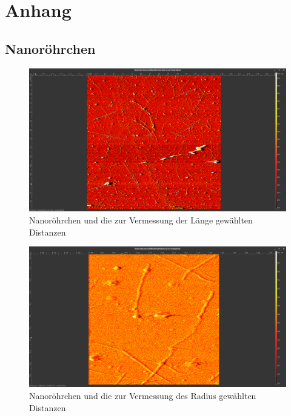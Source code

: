 

\chapter{Anhang}
\label{chap:anhangA}
\section{Nanoröhrchen}
\begin{figure}
    \centering
    \includegraphics[width = \linewidth]{Bilder/Nanotubes/NanoTube15umLaenge2.png}
    \caption{Nanoröhrchen und die zur Vermessung der Länge gewählten Distanzen}
    \label{Nanotube20Mess}
\end{figure}

\begin{figure}
    \centering
    \includegraphics[width = \linewidth]{Bilder/Nanotubes/NanotubesBreiteHoehe2.png}
    \caption{Nanoröhrchen und die zur Vermessung des Radius gewählten Distanzen}
    \label{NanoRadius}
\end{figure}
